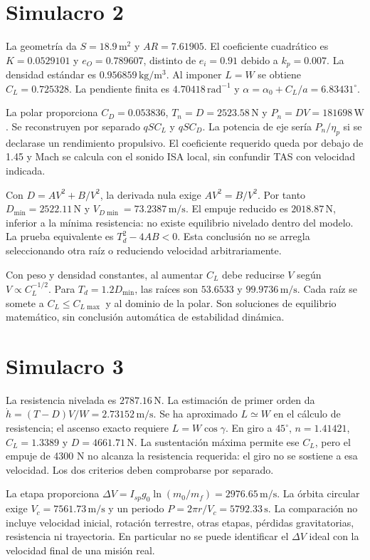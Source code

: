\section{Simulacro 2}
La geometría da $S=18.9\,\mathrm{m^2}$ y $AR=7.61905$. El coeficiente cuadrático es $K=0.0529101$ y $e_O=0.789607$, distinto de $e_i=0.91$ debido a $k_p=0.007$. La densidad estándar es $0.956859\,\mathrm{kg/m^3}$. Al imponer $L=W$ se obtiene $C_L=0.725328$. La pendiente finita es $4.70418\,\mathrm{rad^{-1}}$ y $\alpha=\alpha_0+C_L/a=6.83431^\circ$.

La polar proporciona $C_D=0.053836$, $T_n=D=2523.58\,\mathrm N$ y $P_n=DV=181698\,\mathrm W$. Se reconstruyen por separado $qS C_L$ y $qS C_D$. La potencia de eje sería $P_n/\eta_p$ si se declarase un rendimiento propulsivo. El coeficiente requerido queda por debajo de 1.45 y Mach se calcula con el sonido ISA local, sin confundir TAS con velocidad indicada.

Con $D=AV^2+B/V^2$, la derivada nula exige $AV^2=B/V^2$. Por tanto $D_{\min}=2522.11\,\mathrm N$ y $V_{D\min}=73.2387\,\mathrm{m/s}$. El empuje reducido es $2018.87\,\mathrm N$, inferior a la mínima resistencia: no existe equilibrio nivelado dentro del modelo. La prueba equivalente es $T_d^2-4AB<0$. Esta conclusión no se arregla seleccionando otra raíz o reduciendo velocidad arbitrariamente.

Con peso y densidad constantes, al aumentar $C_L$ debe reducirse $V$ según $V\propto C_L^{-1/2}$. Para $T_d=1.2D_{\min}$, las raíces son $53.6533$ y $99.9736\,\mathrm{m/s}$. Cada raíz se somete a $C_L\leq C_{L\max}$ y al dominio de la polar. Son soluciones de equilibrio matemático, sin conclusión automática de estabilidad dinámica.
\section{Simulacro 3}
La resistencia nivelada es $2787.16\,\mathrm N$. La estimación de primer orden da $\dot h=(T-D)V/W=2.73152\,\mathrm{m/s}$. Se ha aproximado $L\simeq W$ en el cálculo de resistencia; el ascenso exacto requiere $L=W\cos\gamma$. En giro a $45^\circ$, $n=1.41421$, $C_L=1.3389$ y $D=4661.71\,\mathrm N$. La sustentación máxima permite ese $C_L$, pero el empuje de 4300 N no alcanza la resistencia requerida: el giro no se sostiene a esa velocidad. Los dos criterios deben comprobarse por separado.

La etapa proporciona $\Delta V=I_{sp}g_0\ln(m_0/m_f)=2976.65\,\mathrm{m/s}$. La órbita circular exige $V_c=7561.73\,\mathrm{m/s}$ y un periodo $P=2\pi r/V_c=5792.33\,\mathrm s$. La comparación no incluye velocidad inicial, rotación terrestre, otras etapas, pérdidas gravitatorias, resistencia ni trayectoria. En particular no se puede identificar el $\Delta V$ ideal con la velocidad final de una misión real.

